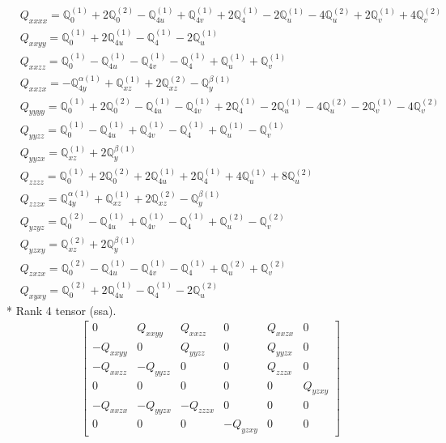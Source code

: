 \documentclass[fleqn,8pt,landscape]{jsarticle}
\begin{document}
\begin{align*}
& Q_{xxxx} = \mathbb{Q}_{0}^{(1)} + 2 \mathbb{Q}_{0}^{(2)} - \mathbb{Q}_{4u}^{(1)} + \mathbb{Q}_{4v}^{(1)} + 2 \mathbb{Q}_{4}^{(1)} - 2 \mathbb{Q}_{u}^{(1)} - 4 \mathbb{Q}_{u}^{(2)} + 2 \mathbb{Q}_{v}^{(1)} + 4 \mathbb{Q}_{v}^{(2)} \\
& Q_{xxyy} = \mathbb{Q}_{0}^{(1)} + 2 \mathbb{Q}_{4u}^{(1)} - \mathbb{Q}_{4}^{(1)} - 2 \mathbb{Q}_{u}^{(1)} \\
& Q_{xxzz} = \mathbb{Q}_{0}^{(1)} - \mathbb{Q}_{4u}^{(1)} - \mathbb{Q}_{4v}^{(1)} - \mathbb{Q}_{4}^{(1)} + \mathbb{Q}_{u}^{(1)} + \mathbb{Q}_{v}^{(1)} \\
& Q_{xxzx} = - \mathbb{Q}_{4y}^{\alpha(1)} + \mathbb{Q}_{xz}^{(1)} + 2 \mathbb{Q}_{xz}^{(2)} - \mathbb{Q}_{y}^{\beta(1)} \\
& Q_{yyyy} = \mathbb{Q}_{0}^{(1)} + 2 \mathbb{Q}_{0}^{(2)} - \mathbb{Q}_{4u}^{(1)} - \mathbb{Q}_{4v}^{(1)} + 2 \mathbb{Q}_{4}^{(1)} - 2 \mathbb{Q}_{u}^{(1)} - 4 \mathbb{Q}_{u}^{(2)} - 2 \mathbb{Q}_{v}^{(1)} - 4 \mathbb{Q}_{v}^{(2)} \\
& Q_{yyzz} = \mathbb{Q}_{0}^{(1)} - \mathbb{Q}_{4u}^{(1)} + \mathbb{Q}_{4v}^{(1)} - \mathbb{Q}_{4}^{(1)} + \mathbb{Q}_{u}^{(1)} - \mathbb{Q}_{v}^{(1)} \\
& Q_{yyzx} = \mathbb{Q}_{xz}^{(1)} + 2 \mathbb{Q}_{y}^{\beta(1)} \\
& Q_{zzzz} = \mathbb{Q}_{0}^{(1)} + 2 \mathbb{Q}_{0}^{(2)} + 2 \mathbb{Q}_{4u}^{(1)} + 2 \mathbb{Q}_{4}^{(1)} + 4 \mathbb{Q}_{u}^{(1)} + 8 \mathbb{Q}_{u}^{(2)} \\
& Q_{zzzx} = \mathbb{Q}_{4y}^{\alpha(1)} + \mathbb{Q}_{xz}^{(1)} + 2 \mathbb{Q}_{xz}^{(2)} - \mathbb{Q}_{y}^{\beta(1)} \\
& Q_{yzyz} = \mathbb{Q}_{0}^{(2)} - \mathbb{Q}_{4u}^{(1)} + \mathbb{Q}_{4v}^{(1)} - \mathbb{Q}_{4}^{(1)} + \mathbb{Q}_{u}^{(2)} - \mathbb{Q}_{v}^{(2)} \\
& Q_{yzxy} = \mathbb{Q}_{xz}^{(2)} + 2 \mathbb{Q}_{y}^{\beta(1)} \\
& Q_{zxzx} = \mathbb{Q}_{0}^{(2)} - \mathbb{Q}_{4u}^{(1)} - \mathbb{Q}_{4v}^{(1)} - \mathbb{Q}_{4}^{(1)} + \mathbb{Q}_{u}^{(2)} + \mathbb{Q}_{v}^{(2)} \\
& Q_{xyxy} = \mathbb{Q}_{0}^{(2)} + 2 \mathbb{Q}_{4u}^{(1)} - \mathbb{Q}_{4}^{(1)} - 2 \mathbb{Q}_{u}^{(2)}
\end{align*}
* Rank 4 tensor (ssa).
\begin{align*}
\begin{bmatrix} 0 & Q_{xxyy} & Q_{xxzz} & 0 & Q_{xxzx} & 0 \\ - Q_{xxyy} & 0 & Q_{yyzz} & 0 & Q_{yyzx} & 0 \\ - Q_{xxzz} & - Q_{yyzz} & 0 & 0 & Q_{zzzx} & 0 \\ 0 & 0 & 0 & 0 & 0 & Q_{yzxy} \\ - Q_{xxzx} & - Q_{yyzx} & - Q_{zzzx} & 0 & 0 & 0 \\ 0 & 0 & 0 & - Q_{yzxy} & 0 & 0 \end{bmatrix}
\end{align*}
\end{document}
